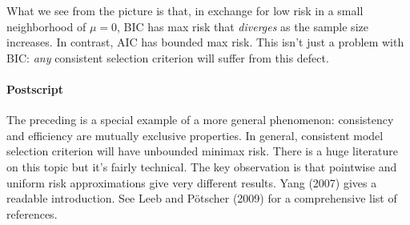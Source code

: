 What we see from the picture is that, in exchange for low risk in a small neighborhood of $\mu=0$, BIC has max risk that \emph{diverges} as the sample size increases. In contrast, AIC has bounded max risk. This isn't just a problem with BIC: \emph{any} consistent selection criterion will suffer from this defect.

\paragraph{Postscript} The preceding is a special example of a more general phenomenon: consistency and efficiency are mutually exclusive properties. In general, consistent model selection criterion will have unbounded minimax risk. There is a huge literature on this topic but it's fairly technical. The key observation is that pointwise and uniform risk approximations give very different results. Yang (2007) gives a readable introduction. See Leeb and P\"{o}tscher (2009) for a comprehensive list of references. 



 
